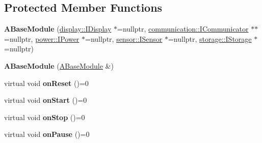 \subsection*{Protected Member Functions}
\begin{DoxyCompactItemize}
\item 
\mbox{\label{classwood_box_1_1module_1_1_a_base_module_acb9dfc130e01d73b4887dd6d58a1bd08}} 
{\bfseries A\+Base\+Module} (\mbox{\hyperlink{classwood_box_1_1display_1_1_i_display}{display\+::\+I\+Display}} $\ast$=nullptr, \mbox{\hyperlink{classwood_box_1_1communication_1_1_i_communicator}{communication\+::\+I\+Communicator}} $\ast$$\ast$=nullptr, \mbox{\hyperlink{classwood_box_1_1power_1_1_i_power}{power\+::\+I\+Power}} $\ast$=nullptr, \mbox{\hyperlink{classwood_box_1_1sensor_1_1_i_sensor}{sensor\+::\+I\+Sensor}} $\ast$=nullptr, \mbox{\hyperlink{classwood_box_1_1storage_1_1_i_storage}{storage\+::\+I\+Storage}} $\ast$=nullptr)
\item 
\mbox{\label{classwood_box_1_1module_1_1_a_base_module_aed2f16158b239a6ad450f3a522809644}} 
{\bfseries A\+Base\+Module} (\mbox{\hyperlink{classwood_box_1_1module_1_1_a_base_module}{A\+Base\+Module}} \&)
\item 
\mbox{\label{classwood_box_1_1module_1_1_a_base_module_a393bee87aaac25c40a7991c9aee5718a}} 
virtual void {\bfseries on\+Reset} ()=0
\item 
\mbox{\label{classwood_box_1_1module_1_1_a_base_module_a7ae47c5d0da877569df890936a93e488}} 
virtual void {\bfseries on\+Start} ()=0
\item 
\mbox{\label{classwood_box_1_1module_1_1_a_base_module_a86ca0e43cfbd4c515cbe02ff42f1737e}} 
virtual void {\bfseries on\+Stop} ()=0
\item 
\mbox{\label{classwood_box_1_1module_1_1_a_base_module_a146eee2d0977546e0fed7bcf5135a8db}} 
virtual void {\bfseries on\+Pause} ()=0
\item 
\mbox{\label{classwood_box_1_1module_1_1_a_base_module_ad0d6ad896184c9966fec33b1f349606b}} 
$$
\end{DoxyCompactItemize}
